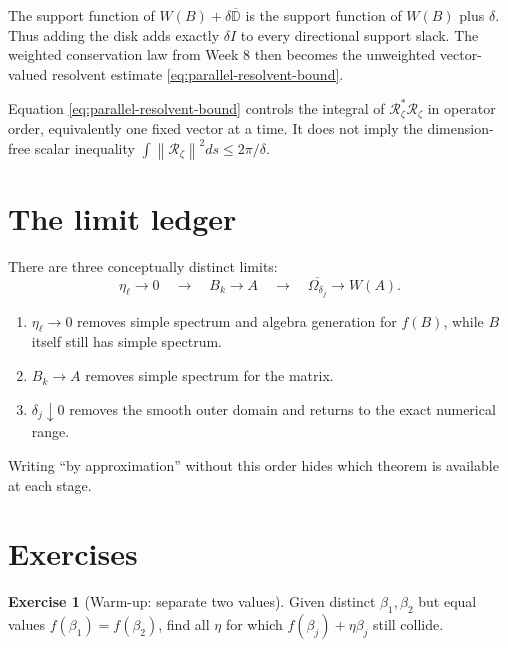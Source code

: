 \documentclass[11pt,oneside,openany]{book}
\theoremstyle{definition}
\newtheorem{exercise}{Exercise}[chapter]
\theoremstyle{remark}
\newcommand{\D}{\mathbb D}
\newcommand{\norm}[1]{\left\lVert #1\right\rVert}
\newcommand{\olD}{\overline{\D}}
\begin{document}
\begin{intuitionbox}
The support function of \(W(B)+\delta\olD\) is the support function of
\(W(B)\) plus \(\delta\).  Thus adding the disk adds exactly
\(\delta I\) to every directional support slack.  The weighted
conservation law from Week 8 then becomes the unweighted
vector-valued resolvent estimate
\eqref{eq:parallel-resolvent-bound}.
\end{intuitionbox}

\begin{pitfall}
Equation \eqref{eq:parallel-resolvent-bound} controls the integral of
\(\mathcal R_\zeta^*\mathcal R_\zeta\) in operator order, equivalently
one fixed vector at a time.  It does not imply the dimension-free
scalar inequality
\(\int\!\norm{\mathcal R_\zeta}^2ds\leq2\pi/\delta\).
\end{pitfall}

\section{The limit ledger}

There are three conceptually distinct limits:
\begin{equation}
  \boxed{
  \eta_\ell\to0
  \quad\longrightarrow\quad
  B_k\to A
  \quad\longrightarrow\quad
  \overline{\Omega_{\delta_j}}\to W(A).
  }
  \label{eq:limit-ledger}
\end{equation}
\begin{enumerate}
  \item \(\eta_\ell\to0\) removes simple spectrum and algebra
  generation for \(f(B)\), while \(B\) itself still has simple
  spectrum.
  \item \(B_k\to A\) removes simple spectrum for the matrix.
  \item \(\delta_j\downarrow0\) removes the smooth outer domain and
  returns to the exact numerical range.
\end{enumerate}
Writing ``by approximation'' without this order hides which theorem is
available at each stage.

\section{Exercises}

\begin{exercise}[Warm-up: separate two values]
Given distinct \(\beta_1,\beta_2\) but equal values
\(f(\beta_1)=f(\beta_2)\), find all \(\eta\) for which
\(f(\beta_j)+\eta\beta_j\) still collide.
\end{exercise}
\end{document}
